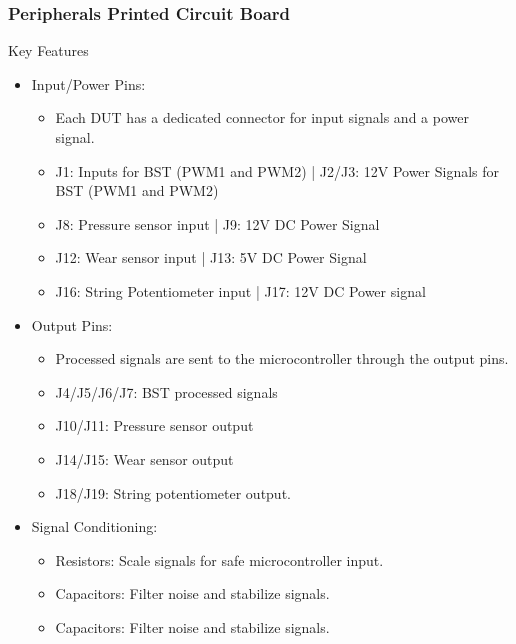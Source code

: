 \documentclass[8pt,compress,aspectratio=169]{beamer}
\begin{document}
\begin{frame}
  \frametitle{Peripherals Printed Circuit Board}
  \begin{minipage}{0.5\textwidth}
    \begin{block}{Key Features}
      \begin{itemize}
          \small
        \item Input/Power Pins:
          \begin{itemize}
              \footnotesize
            \item Each DUT has a dedicated connector for input signals and a power signal.
            \item J1: Inputs for BST (PWM1 and PWM2) | J2/J3: 12V Power Signals for BST (PWM1 and PWM2)
            \item J8: Pressure sensor input | J9: 12V DC Power Signal
            \item J12: Wear sensor input | J13: 5V DC Power Signal
            \item J16: String Potentiometer input | J17: 12V DC Power signal
          \end{itemize}
        \item Output Pins:
          \begin{itemize}
              \footnotesize
            \item Processed signals are sent to the microcontroller through the output pins.
            \item J4/J5/J6/J7: BST processed signals
            \item J10/J11: Pressure sensor output
            \item J14/J15: Wear sensor output
            \item J18/J19: String potentiometer output.
          \end{itemize}
        \item Signal Conditioning:
          \begin{itemize}
              \footnotesize
            \item Resistors: Scale signals for safe microcontroller input.
            \item Capacitors: Filter noise and stabilize signals.
            \item Capacitors: Filter noise and stabilize signals.
          \end{itemize}
      \end{itemize}
    \end{block}
  \end{minipage}

\end{frame}
\end{document}
